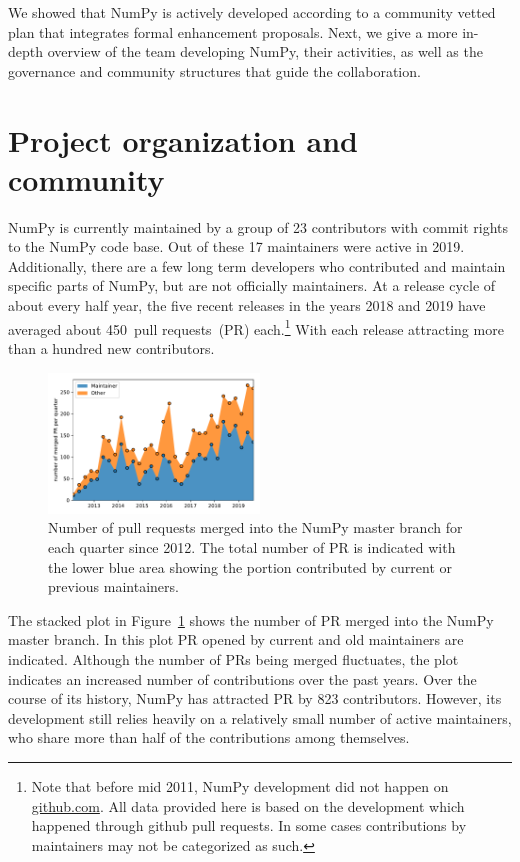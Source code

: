 \documentclass[fleqn,10pt]{wlscirep}
\begin{document}
We showed that NumPy is actively developed according to a community
vetted plan that integrates formal enhancement proposals.  Next, we
give a more in-depth overview of the team developing NumPy, their
activities, as well as the governance and community structures that
guide the collaboration.

\section*{Project organization and community}

NumPy is currently maintained by a group of 23 contributors with commit rights
to the NumPy code base. Out of these 17 maintainers were active in 2019.
Additionally, there are a few long term developers who contributed and maintain
specific parts of NumPy, but are not officially maintainers.
At a release cycle of about every half year, the five recent releases in the years
2018 and 2019 have averaged about 450~pull requests~(PR) each.\footnote{
    Note that before mid 2011, NumPy development did not happen on \url{github.com}.
    All data provided here is based on the development which happened through github
    pull requests. In some cases contributions by maintainers may not be categorized as such.}
With each release attracting more than a hundred new contributors.

\begin{figure}
    \centering
    \includegraphics[width=0.5\textwidth]{scripts/PRs-using-CURRENT_MAINTAINERS.pdf}
    \caption{Number of pull requests merged into the NumPy master branch for each
        quarter since 2012. The total number of PR is indicated with the
        lower blue area showing the portion contributed by current or previous
        maintainers.}\label{fig:prs-over-time}
\end{figure}

The stacked plot in Figure~\ref{fig:prs-over-time} shows the number of
PR merged into the NumPy master branch.
In this plot PR opened by current and old maintainers are indicated.
Although the number of PRs being merged fluctuates,
the plot indicates an increased number of contributions over the past
years.
Over the course of its history, NumPy has attracted PR by 823 contributors.
However, its development still relies heavily on a relatively small number
of active maintainers, who share more than half of the contributions among
themselves.
\end{document}
